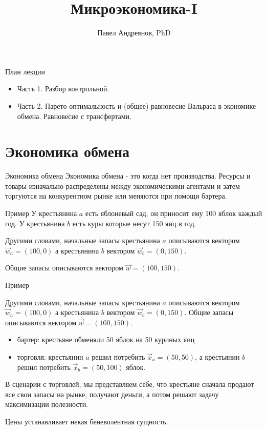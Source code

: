 \documentclass{beamer}
\title{
Микроэкономика-I
}
\author{
Павел Андреянов, PhD
}
\begin{document}
\maketitle

\begin{frame}{План лекции}
\begin{itemize}
  \item Часть 1. Разбор контрольной.
  \item Часть 2. Парето оптимальность и (общее) равновесие Вальраса в экономике обмена. Равновесие с трансфертами.
\end{itemize}
\end{frame}

\section{Экономика обмена}

\begin{frame}{Экономика обмена}
\alert{Экономика обмена} - это когда нет производства. Ресурсы и товары изначально распределены между экономическими агентами и затем \alert{торгуются на конкурентном рынке или меняются при помощи бартера}.
\end{frame}

\begin{frame}{Пример}
У крестьянина $a$ есть яблоневый сад, он приносит ему 100 яблок каждый год. У крестьянина $b$ есть куры которые несут 150 яиц в год. 

Другими словами, \alert{начальные запасы} крестьянина $a$ описываются вектором $\vec w_a = (100,0)$ а крестьянина $b$ вектором $\vec w_b = (0,150)$. 

\alert{Общие запасы} описываются вектором $\vec w = (100,150)$.


\end{frame}

\begin{frame}{Пример}

Другими словами, \alert{начальные запасы} крестьянина $a$ описываются вектором $\vec w_a = (100,0)$ а крестьянина $b$ вектором $\vec w_b = (0,150)$. \alert{Общие запасы} описываются вектором $\vec w = (100,150)$.

\begin{itemize}
  \item \alert{бартер}: крестьяне обменяли 50 яблок на 50 куриных яиц
  \item \alert{торговля}: крестьянин $a$ решил потребить $\vec x_a = (50, 50)$, а крестьянин $b$ решил потребить $\vec x_b = (50, 100)$ яблок. 
\end{itemize}

В сценарии с торговлей, мы представляем себе, что крестьяне сначала продают все свои запасы на рынке, получают деньги, а потом решают задачу максимизации полезности. 

Цены устанавливает некая беневолентная сущность.

\end{frame}
\end{document}

